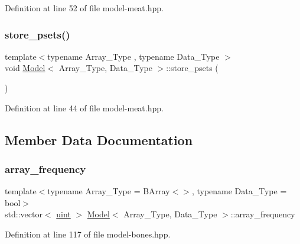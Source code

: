Definition at line 52 of file model-\/meat.\+hpp.

\mbox{\label{class_model_afd6d7130b41f92e5ec1984ea53c83720}} 
\subsubsection{\texorpdfstring{store\+\_\+psets()}{store\_psets()}}
{\footnotesize\ttfamily template$<$typename Array\+\_\+\+Type , typename Data\+\_\+\+Type $>$ \\
void \hyperlink{class_model}{Model}$<$ Array\+\_\+\+Type, Data\+\_\+\+Type $>$\+::store\+\_\+psets (\begin{DoxyParamCaption}{ }\end{DoxyParamCaption})\hspace{0.3cm}{\ttfamily [inline]}}



Definition at line 44 of file model-\/meat.\+hpp.



\subsection{Member Data Documentation}
\mbox{\label{class_model_a55b4255d2514b1b22a0fb7361187fead}} 
\subsubsection{\texorpdfstring{array\+\_\+frequency}{array\_frequency}}
{\footnotesize\ttfamily template$<$typename Array\+\_\+\+Type  = B\+Array$<$$>$, typename Data\+\_\+\+Type  = bool$>$ \\
std\+::vector$<$ \hyperlink{typedefs_8hpp_a91ad9478d81a7aaf2593e8d9c3d06a14}{uint} $>$ \hyperlink{class_model}{Model}$<$ Array\+\_\+\+Type, Data\+\_\+\+Type $>$\+::array\+\_\+frequency}



Definition at line 117 of file model-\/bones.\+hpp.

\mbox{\label{class_model_a880b9e2535fcdaea9cc60d4dbdc7bcbc}} 

